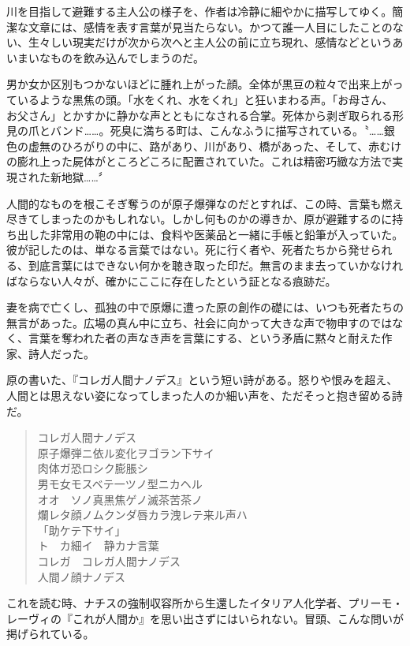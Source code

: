 川を目指して避難する主人公の様子を、作者は冷静に細やかに描写してゆく。簡潔な文章には、感情を表す言葉が見当たらない。かつて誰一人目にしたことのない、生々しい現実だけが次から次へと主人公の前に立ち現れ、感情などというあいまいなものを飲み込んでしまうのだ。

男か女か区別もつかないほどに腫れ上がった顔。全体が黒豆の粒々で出来上がっているような黒焦の頭。「水をくれ、水をくれ」と狂いまわる声。「お母さん、お父さん」とかすかに静かな声とともになされる合掌。死体から剥ぎ取られる形見の爪とバンド\ldots\ldots。死臭に満ちる町は、こんなふうに描写されている。〝\ldots\ldots 銀色の虚無のひろがりの中に、路があり、川があり、橋があった、そして、赤むけの膨れ上った屍体がところどころに配置されていた。これは精密巧緻な方法で実現された新地獄\ldots\ldots〞

人間的なものを根こそぎ奪うのが原子爆弾なのだとすれば、この時、言葉も燃え尽きてしまったのかもしれない。しかし何ものかの導きか、原が避難するのに持ち出した非常用の鞄の中には、食料や医薬品と一緒に手帳と鉛筆が入っていた。彼が記したのは、単なる言葉ではない。死に行く者や、死者たちから発せられる、到底言葉にはできない何かを聴き取った印だ。無言のまま去っていかなければならない人々が、確かにここに存在したという証となる痕跡だ。

妻を病で亡くし、孤独の中で原爆に遭った原の創作の礎には、いつも死者たちの無言があった。広場の真ん中に立ち、社会に向かって大きな声で物申すのではなく、言葉を奪われた者の声なき声を言葉にする、という矛盾に黙々と耐えた作家、詩人だった。

原の書いた、『コレガ人間ナノデス』という短い詩がある。怒りや恨みを超え、人間とは思えない姿になってしまった人のか細い声を、ただそっと抱き留める詩だ。

\begin{quote}
コレガ人間ナノデス\\
原子爆弾ニ依ル変化ヲゴラン下サイ\\
肉体ガ恐ロシク膨脹シ\\
男モ女モスベテ一ツノ型ニカヘル\\
オオ　ソノ真黒焦ゲノ滅茶苦茶ノ\\
爛レタ顔ノムクンダ唇カラ洩レテ来ル声ハ\\
「助ケテ下サイ」\\
ト　カ細イ　静カナ言葉\\
コレガ　コレガ人間ナノデス\\
人間ノ顔ナノデス
\end{quote}

これを読む時、ナチスの強制収容所から生還したイタリア人化学者、プリーモ・レーヴィの『これが人間か』を思い出さずにはいられない。冒頭、こんな問いが掲げられている。

